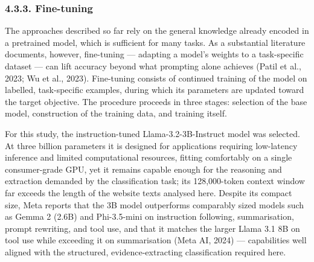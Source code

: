 \documentclass[runningheads]{llncs}
\begin{document}
\subsubsection{4.3.3. Fine-tuning}

The approaches described so far rely on the general knowledge already encoded in a pretrained model, which is sufficient for many tasks. As a substantial literature documents, however, fine-tuning — adapting a model's weights to a task-specific dataset — can lift accuracy beyond what prompting alone achieves (Patil et al., 2023; Wu et al., 2023). Fine-tuning consists of continued training of the model on labelled, task-specific examples, during which its parameters are updated toward the target objective. The procedure proceeds in three stages: selection of the base model, construction of the training data, and training itself.

For this study, the instruction-tuned Llama-3.2-3B-Instruct model was selected. At three billion parameters it is designed for applications requiring low-latency inference and limited computational resources, fitting comfortably on a single consumer-grade GPU, yet it remains capable enough for the reasoning and extraction demanded by the classification task; its 128,000-token context window far exceeds the length of the website texts analysed here. Despite its compact size, Meta reports that the 3B model outperforms comparably sized models such as Gemma 2 (2.6B) and Phi-3.5-mini on instruction following, summarisation, prompt rewriting, and tool use, and that it matches the larger Llama 3.1 8B on tool use while exceeding it on summarisation (Meta AI, 2024) — capabilities well aligned with the structured, evidence-extracting classification required here.
\end{document}
